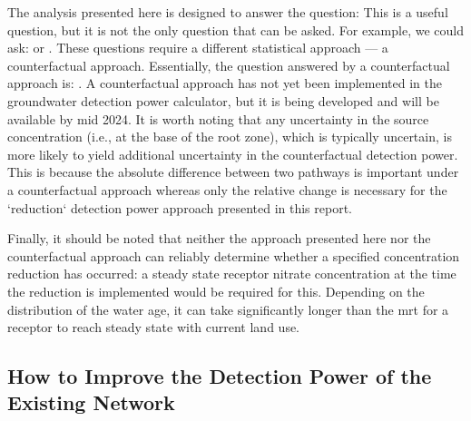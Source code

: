 The analysis presented here is designed to answer the question:  This is a useful question, but it is not the only question that can be asked.
For example, we could ask:  or .
These questions require a different statistical approach --- a counterfactual approach.
Essentially, the question answered by a counterfactual approach is: .
A counterfactual approach has not yet been implemented in the groundwater detection power calculator\citep{dumont_komanawagw_detect_power_2023}, but it is being developed and will be available by mid 2024.
It is worth noting that any uncertainty in the source concentration (i.e., at the base of the root zone), which is typically uncertain, is more likely to yield additional uncertainty in the counterfactual detection power.
This is because the absolute difference between two pathways is important under a counterfactual approach whereas only the relative change is necessary for the `reduction` detection power approach presented in this report.

Finally, it should be noted that neither the approach presented here nor the counterfactual approach can reliably determine whether a specified concentration reduction has occurred: a steady state receptor nitrate concentration at the time the reduction is implemented would be required for this. Depending on the distribution of the water age, it can take significantly longer than the \gls{mrt} for a receptor to reach steady state with current land use.

\subsection[Possible Network Improvements]{How to Improve the Detection Power of the Existing Network}

